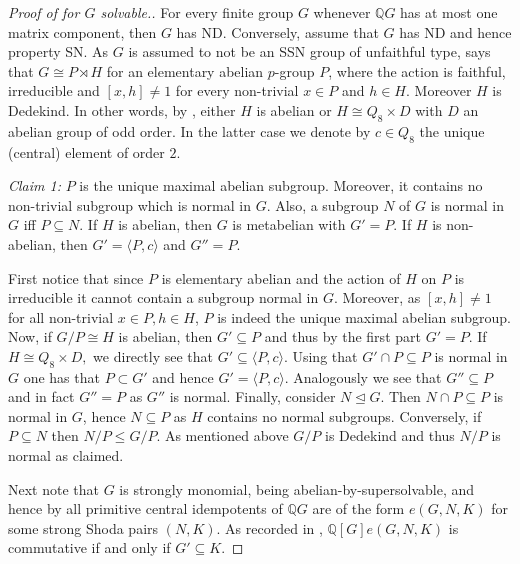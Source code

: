\documentclass[a4paper,10pt]{amsart}
\theoremstyle{definition}
\theoremstyle{remark}
\newcommand{\Q}{{\mathbb Q}}
\begin{document}
\begin{proof}[Proof of  for $G$ solvable.]
For every finite group $G$ whenever $\Q G$ has at most one  matrix component, then $G$ has ND. Conversely, assume that $G$ has ND and hence property SN. As $G$ is assumed to not be an SSN group of unfaithful type,   says that $G \cong P \rtimes H$ for an elementary abelian $p$-group $P$, where the action is faithful, irreducible and $[x,h] \neq 1$ for every non-trivial $x \in P$ and  $h \in H$. Moreover $H$ is Dedekind. In other words, by , either $H$ is abelian or $H \cong Q_8 \times D$ with $D$ an abelian group of odd order. In the latter case we denote by $c \in Q_8$ the unique (central) element of order $2$.

 {\it Claim 1: } $P$ is the unique maximal abelian subgroup. Moreover, it contains no non-trivial subgroup which is normal in $G$. Also, a subgroup $N$ of $G$ is normal in $G$ iff  $P \subseteq N$. If $H$ is abelian, then $G$ is metabelian with $G' = P$. If $H$ is non-abelian, then $G' = \langle P, c \rangle$ and $G'' = P.$  \vspace{0,1cm}
 
\noindent First notice that since $P$ is elementary abelian and the action of $H$ on $P$ is irreducible it cannot contain a subgroup normal in $G$. Moreover, as $[x,h] \neq 1$ for all non-trivial $x \in P, h \in H$, $P$ is indeed the unique maximal abelian subgroup. Now, if $G/P \cong H$ is abelian, then $G' \subseteq P$ and thus by the first part $G' = P$. If $H \cong Q_8 \times D, $ we directly see that $G' \subseteq \langle P, c \rangle$. Using that $G' \cap P \subseteq P$ is normal in $G$ one has that $P \subset G'$ and hence $G' = \langle P, c \rangle$. Analogously we see that $G'' \subseteq P$ and in fact $G'' = P$ as $G''$ is normal. Finally, consider $N \unlhd G$. Then $N \cap P \subseteq P$ is normal in $G$, hence $N \subseteq P$ as $H$ contains no normal subgroups. Conversely, if $P \subseteq N$ then $N/P \leq G/P$. As mentioned above $G/P$ is Dedekind and thus $N/P$ is normal as claimed.

Next note that $G$ is strongly monomial, being abelian-by-supersolvable, and hence by \cite[Theorem 3.5.10.]{GRG1} all primitive central idempotents of $\Q G$ are of the form $e(G,N,K)$ for some strong Shoda pairs $(N,K)$. As recorded in \cite[Lemma 2.4.]{JespersSun}, $\Q[G]e(G,N,K)$ is commutative if and only if $G' \subseteq K$.\vspace{0.1cm}


\end{proof}
\end{document}
